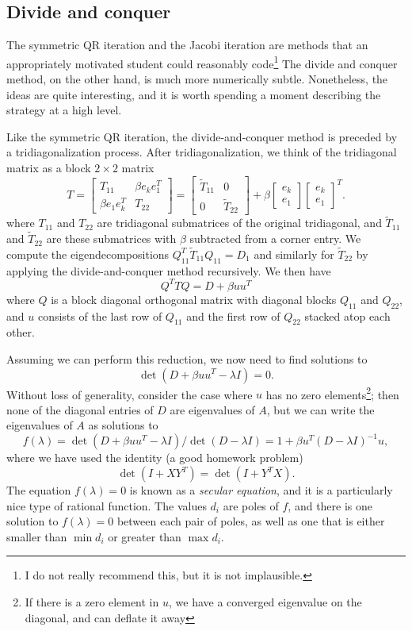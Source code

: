\subsection{Divide and conquer}

The symmetric QR iteration and the Jacobi iteration are methods that
an appropriately motivated student could reasonably code\footnote{%
I do not really recommend this, but it is not implausible.}
The divide and conquer method, on the other hand, is much more
numerically subtle.  Nonetheless, the ideas are quite interesting,
and it is worth spending a moment describing the strategy at a
high level.

Like the symmetric QR iteration, the divide-and-conquer method is
preceded by a tridiagonalization process.  After tridiagonalization,
we think of the tridiagonal matrix as a block $2 \times 2$ matrix
\[
  T =
  \begin{bmatrix}
    T_{11} & \beta e_{k} e_1^T \\
    \beta e_1 e_{k}^T & T_{22}
  \end{bmatrix} =
  \begin{bmatrix}
    \tilde{T}_{11} & 0 \\ 0 & \tilde{T}_{22}
  \end{bmatrix} +
  \beta
  \begin{bmatrix} e_k \\ e_1 \end{bmatrix}
  \begin{bmatrix} e_k \\ e_1 \end{bmatrix}^T.
\]
where $T_{11}$ and $T_{22}$ are tridiagonal submatrices of the original
tridiagonal, and $\tilde{T}_{11}$ and $\tilde{T}_{22}$ are these
submatrices with $\beta$ subtracted from a corner entry.  We compute
the eigendecompositions $Q_{11}^T \tilde{T}_{11} Q_{11} = D_1$ and
similarly for $\tilde{T}_{22}$ by applying the divide-and-conquer
method recursively.  We then have
\[
  Q^T T Q = D + \beta uu^T
\]
where $Q$ is a block diagonal orthogonal matrix with diagonal blocks
$Q_{11}$ and $Q_{22}$, and $u$ consists of the last row of $Q_{11}$
and the first row of $Q_{22}$ stacked atop each other.

Assuming we can perform this reduction, we now need to find
solutions to
\[
  \det(D + \beta uu^T - \lambda I) = 0.
\]
Without loss of generality, consider the case where $u$ has no zero
elements\footnote{%
If there is a zero element in $u$, we have a converged eigenvalue on
the diagonal, and can deflate it away}; then none of the diagonal
entries of $D$ are eigenvalues of $A$, but we can write the eigenvalues
of $A$ as solutions to
\[
  f(\lambda) = \det(D + \beta uu^T - \lambda I) / \det(D - \lambda I)
  = 1 + \beta u^T (D-\lambda I)^{-1} u,
\]
where we have used the identity (a good homework problem)
\[
  \det(I+XY^T) = \det(I+Y^T X).
\]
The equation $f(\lambda) = 0$ is known as a {\em secular equation},
and it is a particularly nice type of rational function.  The values
$d_i$ are poles of $f$, and there is one solution to $f(\lambda) = 0$
between each pair of poles, as well as one that is either smaller
than $\min d_i$ or greater than $\max d_i$.

